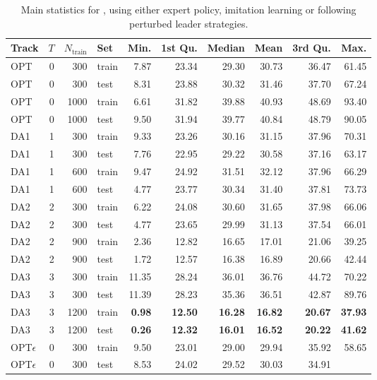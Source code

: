 \begin{table}[ht]
\caption{Main statistics for  \namerho, using either expert
   policy, imitation learning or following perturbed leader 
   strategies.}\label{tbl:il:stats} 
\centering
\begin{tabular}{lrrlrrrrrr}
  \toprule
  Track & $T$ & $N_{\text{train}}$ & Set & Min. & 1st Qu. & Median & Mean & 
  3rd Qu. & Max. \\ 
  \midrule
  OPT & 0 & 300 & train & 7.87 & 23.34 & 29.30 & 30.73 & 36.47 & 61.45 \\ 
  OPT & 0 & 300 & test & 8.31 & 23.88 & 30.32 & 31.46 & 37.70 & 67.24 \\ 
  OPT & 0 & 1000 & train & 6.61 & 31.82 & 39.88 & 40.93 & 48.69 & 93.40 \\ 
  OPT & 0 & 1000 & test & 9.50 & 31.94 & 39.77 & 40.84 & 48.79 & 90.05 \\ 
  DA1 & 1 & 300 & train & 9.33 & 23.26 & 30.16 & 31.15 & 37.96 & 70.31 \\ 
  DA1 & 1 & 300 & test & 7.76 & 22.95 & 29.22 & 30.58 & 37.16 & 63.17 \\ 
  DA1 & 1 & 600 & train & 9.47 & 24.92 & 31.51 & 32.12 & 37.96 & 66.29 \\ 
  DA1 & 1 & 600 & test & 4.77 & 23.77 & 30.34 & 31.40 & 37.81 & 73.73 \\ 
  DA2 & 2 & 300 & train & 6.22 & 24.08 & 30.60 & 31.65 & 37.98 & 66.06 \\ 
  DA2 & 2 & 300 & test & 4.77 & 23.65 & 29.99 & 31.13 & 37.54 & 66.01 \\ 
  DA2 & 2 & 900 & train & 2.36 & 12.82 & 16.65 & 17.01 & 21.06 & 39.25 \\ 
  DA2 & 2 & 900 & test & 1.72 & 12.57 & 16.38 & 16.89 & 20.66 & 42.44 \\ 
  DA3 & 3 & 300 & train & 11.35 & 28.24 & 36.01 & 36.76 & 44.72 & 70.22 \\ 
  DA3 & 3 & 300 & test & 11.39 & 28.23 & 35.36 & 36.51 & 42.87 & 89.76 \\ 
  DA3 & 3 & 1200 & train & \textbf{0.98} & \textbf{12.50} & \textbf{16.28} & 
  \textbf{16.82} & \textbf{20.67} & \textbf{37.93} \\ 
  DA3 & 3 & 1200 & test & \textbf{0.26} & \textbf{12.32} & \textbf{16.01} & 
  \textbf{16.52} & \textbf{20.22} & \textbf{41.62} \\ 
  OPT$\epsilon$ & 0 & 300 & train & 9.50 & 23.01 & 29.00 & 29.94 & 35.92 & 
  58.65 \\ 
  OPT$\epsilon$ & 0 & 300 & test & 8.53 & 24.02 & 29.52 & 30.03 & 34.91 & 

\end{tabular}
\end{table}
